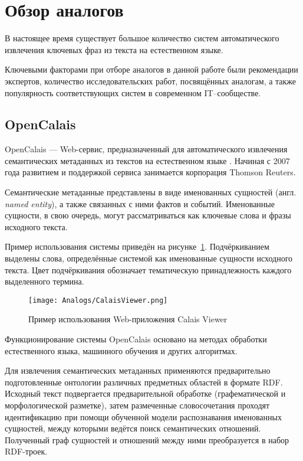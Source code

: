 \section{Обзор аналогов}
\label{sec:Analogs}
В настоящее время существует большое количество систем
автоматического извлечения ключевых фраз из текста на
естественном языке.

Ключевыми факторами при отборе аналогов в данной работе были
рекомендации экспертов, количество исследовательских работ,
посвящённых аналогам, а также популярность соответствующих
систем в современном IT--сообществе.

\subsection{OpenCalais}
\label{subsec:OpenCalais}
OpenCalais — Web-сервис, предназначенный для автоматического
извлечения семантических метаданных из текстов на естественном
языке \cite{OpenCalais}. Начиная с 2007 года развитием и
поддержкой сервиса занимается корпорация Thomson Reuters.

Семантические метаданные представлены в виде именованных сущностей
(англ. \emph{named entity}), а также связанных с ними фактов и
событий. Именованные сущности, в свою очередь, могут рассматриваться
как ключевые слова и фразы исходного текста.

Пример использования системы приведён на
рисунке~\ref{fig:Analogs:OpenCalais}. Подчёркиванием выделены слова,
определённые системой как именованные сущности исходного текста.
Цвет подчёркивания обозначает тематическую принадлежность каждого
выделенного термина.

\begin{landscape}
\begin{figure}[ht]
\centering
  \texttt{[image: Analogs/CalaisViewer.png]}
  \caption{Пример использования Web-приложения Calais Viewer}
  \label{fig:Analogs:OpenCalais}
\end{figure}
\end{landscape}

Функционирование системы OpenCalais основано на методах обработки
естественного языка, машинного обучения и других алгоритмах.

Для извлечения семантических метаданных применяются предварительно
подготовленные онтологии различных предметных областей в формате RDF.
Исходный текст подвергается предварительной обработке
(графематической и морфологической разметке), затем размеченные
словосочетания проходят идентификацию при помощи обученной модели
распознавания именованных сущностей, между которыми ведётся поиск
семантических отношений. Полученный граф сущностей и отношений между
ними преобразуется в набор RDF-троек.

